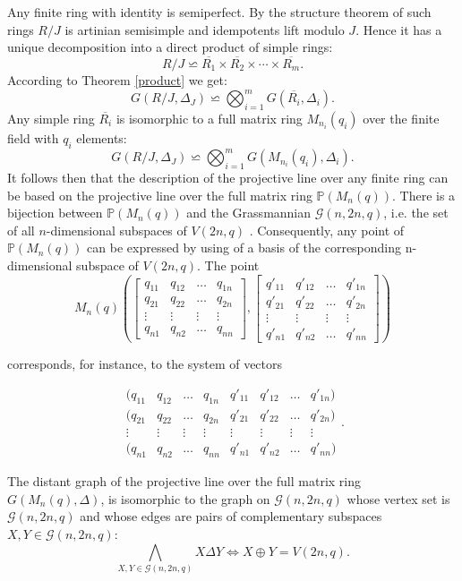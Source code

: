 \documentclass[12pt,a4paper]{article}
\theoremstyle{definition}
\begin{document}
Any finite ring with identity is semiperfect. By the structure theorem of such rings \cite{behrens} $R/J$ is artinian semisimple and idempotents lift modulo $J$.
Hence it has a unique decomposition into a direct product of simple rings:
$$R/J\backsimeq \overline{R_1}\times\overline{R_2}\times\cdots\times\overline{R_m}.$$
According to Theorem \ref{product} we get: $$G(R/J, \Delta_J)\backsimeq\bigotimes_{i=1}^m G(\overline{R_i}, \Delta_i).$$
Any simple ring $\overline{R_i}$ is isomorphic to a full matrix ring $M_{n_i}(q_i)$ over the finite field with $q_i$ elements:
$$G(R/J, \Delta_J)\backsimeq\bigotimes_{i=1}^m G(M_{n_i}(q_i), \Delta_i).$$
It follows then that the description of the projective line over any finite
ring can be based on the projective line over the full matrix ring $\mathbb{P}(M_n(q))$. There is a bijection between $\mathbb{P}(M_n(q))$ and the Grassmannian $\mathscr{G}(n, 2n, q)$, i.e.  the set of all $n$-dimensional subspaces of $V(2n, q)$  \cite[2.4 Theorem.]{spreads}. Consequently, any point  of $\mathbb{P}(M_n(q))$ can be expressed by using of a basis of the corresponding n-dimensional subspace of $V(2n, q)$. The point
\medskip
$$M_n(q)\left(\left[\begin{array}{cclr}
q_{11}&q_{12}&\ldots&q_{1n}\\q_{21}&q_{22}&\ldots&q_{2n}\\ \vdots &\vdots&\vdots&\vdots\\ q_{n1}&q_{n2}&\ldots&q_{nn}
\end{array}\right], \left[\begin{array}{cclr}
q'_{11}&q'_{12}&\ldots&q'_{1n}\\q'_{21}&q'_{22}&\ldots&q'_{2n}\\ \vdots &\vdots&\vdots&\vdots\\ q'_{n1}&q'_{n2}&\ldots&q'_{nn}
\end{array}\right]\right)$$

 corresponds, for instance, to the system of vectors 

$$\begin{array}{cclrcccc}
(q_{11}&q_{12}&\ldots&q_{1n}&q'_{11}&q'_{12}&\ldots&q'_{1n})\\(q_{21}&q_{22}&\ldots&q_{2n}&q'_{21}&q'_{22}&\ldots&q'_{2n})\\ \vdots &\vdots&\vdots&\vdots& \vdots &\vdots&\vdots&\vdots\\ (q_{n1}&q_{n2}&\ldots&q_{nn}&q'_{n1}&q'_{n2}&\ldots&q'_{nn})
\end{array}.$$

The distant graph of the projective line over the full matrix ring $G(M_n(q), \Delta)$, is isomorphic to the graph on $\mathscr{G}(n, 2n, q)$ whose vertex set is $\mathscr{G}(n, 2n, q)$ and whose edges are pairs of complementary subspaces $X, Y \in \mathscr{G}(n, 2n, q)$:
$$\bigwedge_{X, Y \in \mathscr{G}(n, 2n, q)}X\Delta Y \Leftrightarrow X\oplus Y=V(2n, q).$$
\end{document}
